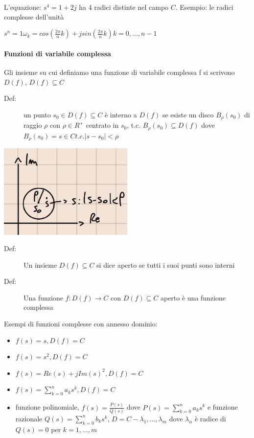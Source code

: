 \documentclass[a4paper, 12pt]{book}
\theoremstyle{plain}
\begin{document}
L'equazione: $s^4=1+2j$ ha 4 radici distinte nel campo $C$.
Esempio: le radici complesse dell'unità

$s^n=1 \omega_k=cos(\frac{2\pi}{n}k) + jsin(\frac{2\pi}{n}k) k=0,...,n-1$

\paragraph{Funzioni di variabile complessa}

Gli insieme su cui definiamo una funzione di variabile complessa
 f si scrivono $D(f)$, $D(f)\subseteq C$
 \begin{description}
     \item[Def: ]un punto $s_0\in D(f)\subseteq C$ è interno a $D(f)$
     se esiste un disco $B_\rho(s_0)$ di raggio $\rho$ con $\rho\in R^+$ centrato
     in $s_0$, t.c. $B_\rho(s_0)\subseteq D(f)$ dove $B_\rho(s_0)={s\in C t.c. |s-s_0| < \rho}$
 \end{description}
 \begin{center}
     \includegraphics[width=0.5\textwidth]{num_comp11.png}
 \end{center}
 \begin{description}
     \item[Def: ]Un insieme $D(f)\subseteq C$ si dice aperto se tutti i suoi punti
     sono interni 
     \item [Def: ]Una funzione $f:D(f)\rightarrow C$ con $D(f)\subseteq C$ aperto
     è una funzione complessa
 \end{description}
 Esempi di funzioni complesse con annesso dominio:
 \begin{itemize}
     \item $f(s) = s, D(f) = C$
     \item $f(s)=s^2,D(f)=C$
     \item $f(s)=Re(s)+jIm(s)^2, D(f)=C$
     \item $f(s)=\sum_{k=0}^n a_ks^k, D(f)=C$
     \item funzione polinomiale, $f(s)=\frac{P(s)}{Q(s)}$ dove $P(s)=\sum_{k=0}^n a_ks^k$ e funzione razionale $Q(s)=\sum_{k=0}^n b_ks^k$,
     $D=C-{\lambda_1,...,\lambda_m}$ dove $\lambda_\alpha$ è radice di $Q(s)=0$ per $k=1,...,m$
 \end{itemize}
\end{document}
